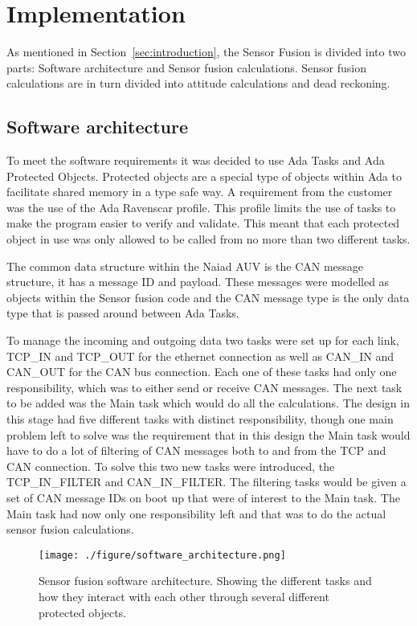 \pagebreak
\section{Implementation}\label{sec:implementation}
As mentioned in Section~\ref{sec:introduction}, the Sensor Fusion is divided into two parts: Software architecture and Sensor fusion calculations. Sensor fusion calculations are in turn divided into attitude
calculations and dead reckoning.

\subsection{Software architecture}
To meet the software requirements it was decided to use Ada Tasks and Ada
Protected Objects. Protected objects are a special type of objects within Ada
to facilitate shared memory in a type safe way. A requirement from the
customer was the use of the Ada Ravenscar profile. This profile limits
the use of tasks to make the program easier to verify and validate. This meant
that each protected object in use was only allowed to be called from no more than two
different tasks.

The common data structure within the Naiad AUV is the CAN message structure,
it has a message ID and payload. These messages were modelled as objects within
the Sensor fusion code and the CAN message type is the only data type that
is passed around between Ada Tasks.

To manage the incoming and outgoing data two tasks were set up for each link,
TCP\_IN and TCP\_OUT for the ethernet connection as well as CAN\_IN and CAN\_OUT for
the CAN bus connection. Each one of these tasks had only one responsibility, which
was to either send or receive CAN messages.
The next task to be added was the Main
task which would do all the calculations. The design in this stage had five
different tasks with distinct responsibility, though one main problem left to solve
was the requirement that in this design the Main task would have to do a lot of
filtering of CAN messages both to and from the TCP and CAN connection. To solve this
two new tasks were introduced, the TCP\_IN\_FILTER and CAN\_IN\_FILTER. The filtering
tasks would be given a set of CAN message IDs on boot up that were of interest to
the Main task. The Main task had now only one responsibility left and that was
to do the actual sensor fusion calculations.

\begin{figure}[ht]
    \texttt{[image: ./figure/software\_architecture.png]}
    \caption{Sensor fusion software architecture. Showing the different tasks and
    how they interact with each other through several different protected objects.}
    \label{fig:software_architecture}
\end{figure}

